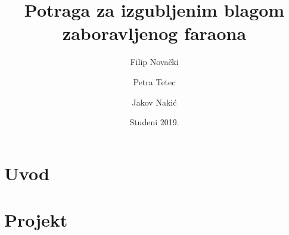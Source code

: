 \documentclass[11pt]{article}
\title{Potraga za izgubljenim blagom zaboravljenog faraona}
\author{Filip Novački \and Petra Tetec \and Jakov Nakić}
\date{Studeni 2019.}
\begin{document}

\pagebreak
\tableofcontents

\pagebreak

\section{Uvod}

\section{Projekt}
\end{document}
